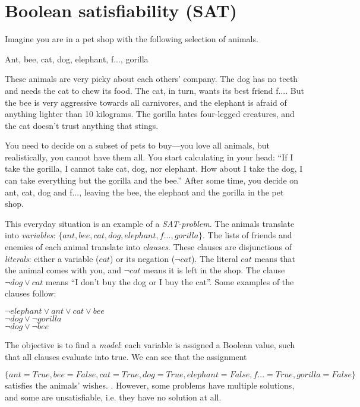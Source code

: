 \section{Boolean satisfiability (SAT)}


Imagine you are in a pet shop with the following selection of animals.

{\center Ant, bee, cat, dog, elephant, f..., gorilla}

These animals are very picky about each others' company. The dog has no teeth and needs the cat to chew its food. The cat, in turn, wants its best friend f.... 
But the bee is very aggressive towards all carnivores, and the elephant is afraid of anything lighter than 10 kilograms. The gorilla hates four-legged creatures, and the cat doesn't trust anything that stings. 

You need to decide on a subset of pets to buy---you love all animals, but realistically, you cannot have them all. You start calculating in your head: ``If I take the gorilla, I cannot take cat, dog, nor elephant. How about I take the dog, I can take everything but the gorilla and the bee.''
After some time, you decide on ant, cat, dog and f..., leaving the bee, the elephant and the gorilla in the pet shop.


This everyday situation is an example of a \emph{SAT-problem}.
The animals translate into \emph{variables}: $\{ant, bee, cat, dog, elephant, f..., gorilla\}$.
The lists of friends and enemies of each animal translate into \emph{clauses}.
These clauses are disjunctions of \emph{literals}: either a variable ($cat$) or its negation ($\neg{}cat$).
The literal $cat$ means that the animal comes with you, 
and $\neg{}cat$ means it is left in the shop. 
The clause $\neg{}dog \vee cat$ means ``I don't buy the dog or I buy the cat''. 
Some examples of the clauses follow:

\begin{center}
$\neg{}elephant \vee ant \vee cat \vee bee$ \\
$\neg{}dog \vee \neg{}gorilla$ \\
$\neg{}dog \vee \neg{}bee$ \\
\end{center}

The objective is to find a \emph{model}: each variable is assigned a Boolean value, such that all clauses evaluate into true. We can see that the assignment 

$\{ant=True, bee=False, cat=True, dog=True, elephant=False, f...=True, gorilla=False\}$ 
\noindent satisfies the animals' wishes.
. However, some problems have multiple solutions, and some are unsatisfiable, i.e. they have no solution at all.


